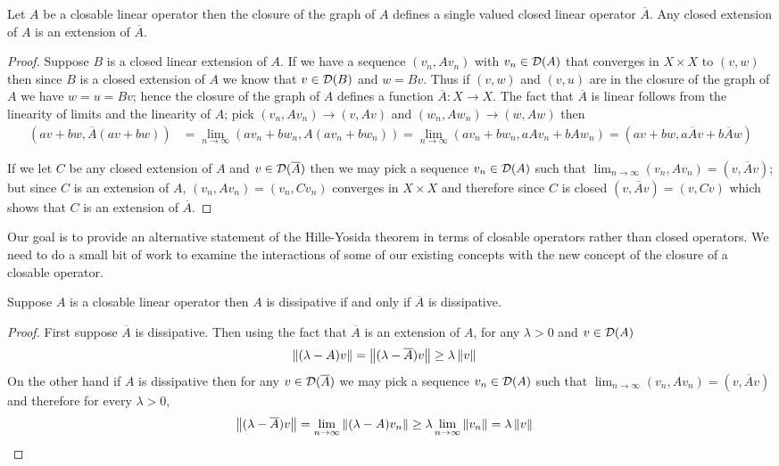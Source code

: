 \begin{prop}Let $A$ be a closable linear operator then the closure of the graph of $A$ defines a single valued closed linear operator $\overline{A}$.  Any closed extension of $A$ is an extension of $\overline{A}$.
\end{prop}
\begin{proof}
Suppose $B$ is a closed linear extension of $A$.  If we have a sequence $(v_n, A v_n)$ with $v_n \in \mathcal{D}(A)$ that converges in $X \times X$ to $(v,w)$ then since $B$ is a closed extension of $A$ we know that $v \in \mathcal{D}(B)$ and $w = B v$.  Thus if $(v,w)$ and $(v,u)$ are in the closure of the graph of $A$ we have $w = u = B v$; hence the closure of the graph of $A$ defines a function $\overline{A} : X \to X$.  The fact that $\overline{A}$ is linear follows from the linearity of limits and the linearity of $A$; pick $(v_n, A v_n) \to (v, Av)$ and $(w_n, A w_n) \to (w, A w)$ then 
\begin{align*}
(a v + b w, \overline{A}(a v + b w)) 
&=\lim_{n \to \infty} (a v_n + b w_n, A(a v_n + b w_n)) 
= \lim_{n \to \infty} (a v_n + b w_n, a A v_n + b A w_n) 
= (a v + b w, a \overline{A} v + b \overline{A} w) 
\end{align*}

If we let $C$ be any closed extension of $A$ and $v \in \mathcal{D}(\overline{A})$ then we may pick a sequence $v_n \in \mathcal{D}(A)$ such that $\lim_{n \to \infty} (v_n, A v_n) = (v, \overline{A} v)$; but since $C$ is an extension of $A$, $(v_n, A v_n) = (v_n, C v_n)$ converges in $X \times X$ and therefore since $C$ is closed $(v, \overline{A} v) =  (v, C v)$ which shows that $C$ is an extension of $\overline{A}$.
\end{proof}

Our goal is to provide an alternative statement of the Hille-Yosida theorem in terms of closable operators rather than closed operators. We need to do a small bit of work to examine 
the interactions of some of our existing concepts with the new concept of the closure of a closable operator.

\begin{lem}\label{ClosableDissipativeClosure}Suppose $A$ is a closable linear operator then $A$ is dissipative if and only if $\overline{A}$ is dissipative.
\end{lem}
\begin{proof}
First suppose $\overline{A}$ is dissipative.  Then using the fact that $\overline{A}$ is an extension of $A$, for any $\lambda > 0$ and $v \in \mathcal{D}(A)$
\begin{align*}
\left \lVert (\lambda - A)v \right \rVert &= \left \lVert (\lambda - \overline{A})v \right \rVert \geq \lambda \left \lVert v \right \rVert
\end{align*}
On the other hand if $A$ is dissipative then for any $v \in \mathcal{D}(\overline{A})$ we may pick a sequence $v_n \in \mathcal{D}(A)$ such that $\lim_{n \to \infty} (v_n,A v_n) = (v, \overline{A}v)$ and therefore for every $\lambda > 0$,
\begin{align*}
\left \lVert  (\lambda - \overline{A}) v \right \rVert &= \lim_{n \to \infty} \left \lVert  (\lambda - A) v_n \right \rVert \geq \lambda \lim_{n \to \infty} \left \lVert  v_n \right \rVert = \lambda \left \lVert v \right \rVert 
\end{align*}
\end{proof}

